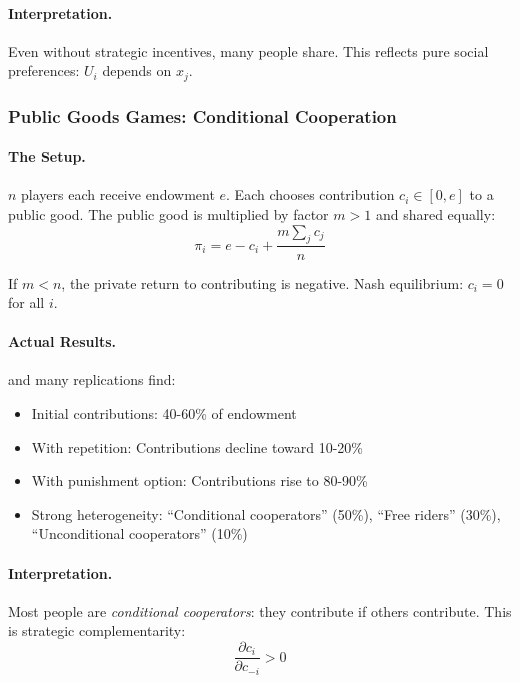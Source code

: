 \paragraph{Interpretation.}
Even without strategic incentives, many people share.
This reflects pure social preferences: $U_i$ depends on $x_j$.

\subsubsection{Public Goods Games: Conditional Cooperation}

\paragraph{The Setup.}
$n$ players each receive endowment $e$. Each chooses contribution $c_i \in [0, e]$ to a public good.
The public good is multiplied by factor $m > 1$ and shared equally:
\begin{equation}
  \pi_i = e - c_i + \frac{m \sum_j c_j}{n}
\end{equation}

If $m < n$, the private return to contributing is negative.
Nash equilibrium: $c_i = 0$ for all $i$.

\paragraph{Actual Results.}
\citet{fehrgaechter2000} and many replications find:
\begin{itemize}
  \item Initial contributions: 40-60\% of endowment
  \item With repetition: Contributions decline toward 10-20\%
  \item With punishment option: Contributions rise to 80-90\%
  \item Strong heterogeneity: ``Conditional cooperators'' (50\%), ``Free riders'' (30\%), ``Unconditional cooperators'' (10\%)
\end{itemize}

\paragraph{Interpretation.}
Most people are \emph{conditional cooperators}: they contribute if others contribute.
This is strategic complementarity:
\begin{equation}
  \frac{\partial c_i}{\partial c_{-i}} > 0
\end{equation}

